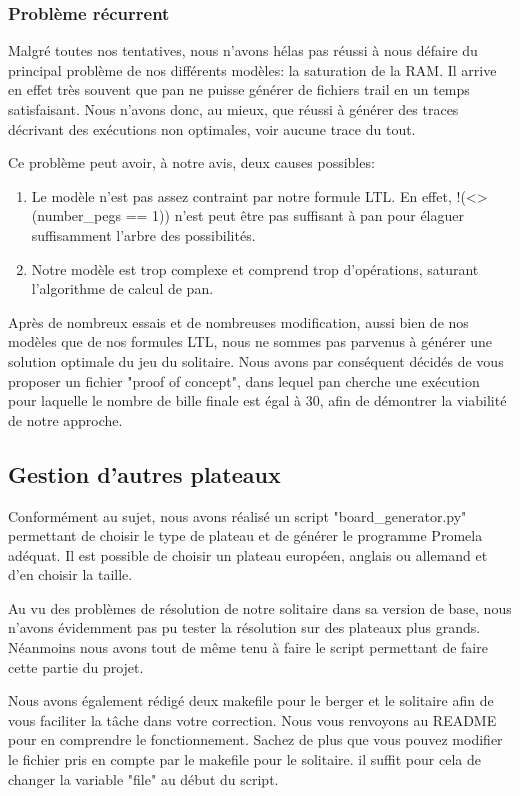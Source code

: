 \documentclass[12pt, a4paper]{report}
\begin{document}
\subsubsection{Problème récurrent}

Malgré toutes nos tentatives, nous n'avons hélas pas réussi à nous défaire du principal problème de nos différents modèles: la saturation de la RAM. Il arrive en effet très souvent que pan ne puisse générer de fichiers trail en un temps satisfaisant. Nous n'avons donc, au mieux, que réussi à générer des traces décrivant des exécutions non optimales, voir aucune trace du tout.

Ce problème peut avoir, à notre avis, deux causes possibles:
\begin{enumerate}
\item Le modèle n'est pas assez contraint par notre formule LTL. En effet, !(<>(number\_pegs == 1)) n'est peut être pas suffisant à pan pour élaguer suffisamment l'arbre des possibilités.
\item Notre modèle est trop complexe et comprend trop d'opérations, saturant l'algorithme de calcul de pan.
\end{enumerate}

Après de nombreux essais et de nombreuses modification, aussi bien de nos modèles que de nos formules LTL, nous ne sommes pas parvenus à générer une solution optimale du jeu du solitaire.
Nous avons par conséquent décidés de vous proposer un fichier "proof of concept", dans lequel pan
cherche une exécution pour laquelle le nombre de bille finale est égal à 30, afin de démontrer la viabilité de notre approche. 

\subsection{Gestion d'autres plateaux}

Conformément au sujet, nous avons réalisé un script "board\_generator.py" permettant de choisir le type de plateau et de générer le programme Promela adéquat. Il est possible de choisir un plateau européen, anglais ou allemand et d'en choisir la taille.

Au vu des problèmes de résolution de notre solitaire dans sa version de base, nous n'avons évidemment pas pu tester la résolution sur des plateaux plus grands. Néanmoins nous avons tout de même tenu à faire le script permettant de faire cette partie du projet.

Nous avons également rédigé deux makefile pour le berger et le solitaire afin de vous faciliter la tâche dans votre correction. Nous vous renvoyons au README pour en comprendre le fonctionnement. Sachez de plus que vous pouvez modifier le fichier pris en compte par le makefile pour le solitaire. il suffit pour cela de changer la variable "file" au début du script.
\end{document}
